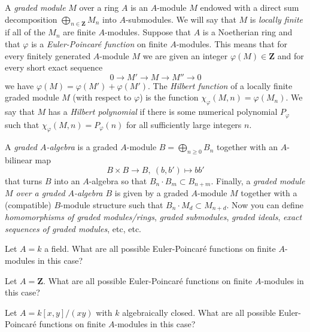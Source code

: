 \begin{definition}
\label{definition-graded-module}
A {\it graded module} $M$ over a ring $A$ is an $A$-module $M$
endowed with a direct sum decomposition
$
\bigoplus\nolimits_{n \in {\mathbf Z}} M_n
$
into $A$-submodules. We will say that $M$ is {\it locally finite} if all of
the $M_n$ are finite $A$-modules. Suppose that $A$ is a Noetherian ring and
that $\varphi$ is a {\it Euler-Poincar\'e function} on finite $A$-modules.
This means that for every finitely generated $A$-module $M$ we are given an
integer $\varphi(M) \in {\mathbf Z}$ and for every short exact sequence
$$
0
\longrightarrow
M'
\longrightarrow
M
\longrightarrow
M''
\longrightarrow
0
$$
we have $\varphi(M) = \varphi(M') + \varphi(M')$. The {\it Hilbert function}
of a locally finite graded module $M$ (with respect to $\varphi$) is the
function $\chi_\varphi(M, n) = \varphi(M_n)$. We say that $M$ has a
{\it Hilbert polynomial} if there is some numerical polynomial
$P_\varphi$ such that $\chi_\varphi(M, n) = P_\varphi(n)$ for all sufficiently
large integers $n$.
\end{definition}

\begin{definition}
\label{definition-graded-algebra}
A {\it graded $A$-algebra} is a graded $A$-module
$B = \bigoplus_{n \geq 0} B_n$ together with an $A$-bilinear map
$$
B \times B \longrightarrow B, \ (b, b') \longmapsto bb'
$$
that turns $B$ into an $A$-algebra so that $B_n \cdot B_m \subset B_{n + m}$.
Finally, a {\it graded module $M$ over a graded $A$-algebra $B$} is given
by a graded $A$-module $M$ together with a (compatible) $B$-module structure
such that $B_n \cdot M_d \subset M_{n + d}$. Now you can define {\it
homomorphisms of graded modules/rings}, {\it graded submodules}, {\it graded
ideals}, {\it exact sequences of graded modules}, etc, etc.
\end{definition}

\begin{exercise}
\label{exercise-Euler-Poincare-field}
Let $A = k$ a field. What are all possible Euler-Poincar\'e functions
on finite $A$-modules in this case?
\end{exercise}

\begin{exercise}
\label{exercise-Euler-Poincare-Z}
Let $A ={\mathbf Z}$. What are all possible Euler-Poincar\'e functions
on finite $A$-modules in this case?
\end{exercise}

\begin{exercise}
\label{exercise-Euler-Poincare-node}
Let $A = k[x, y]/(xy)$ with $k$ algebraically closed. What are all
possible Euler-Poincar\'e functions on finite $A$-modules in this case?
\end{exercise}

